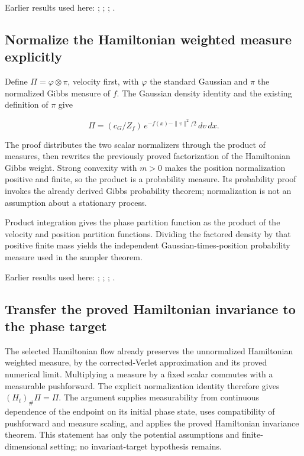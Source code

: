 \documentclass[11pt,a4paper]{report}
\begin{document}
Earlier results used here: \cite[Section~3.37.17]{LangevinLean2026ULASC}; \cite[Section~3.37.2]{LangevinLean2026ULASC}; \cite[Section~3.37.4]{LangevinLean2026ULASC}; \cite[Section~3.37.5]{LangevinLean2026ULASC}.
\subsection{\texorpdfstring{Normalize the Hamiltonian weighted measure explicitly}{Normalize the Hamiltonian weighted measure explicitly}}
\label{report-step-KineticLangevin-GibbsTarget-lean-2}


Define \(\Pi=\varphi\otimes\pi\), velocity first, with \(\varphi\) the standard Gaussian and \(\pi\) the normalized Gibbs measure of \(f\). The Gaussian density identity and the existing definition of \(\pi\) give

\[\Pi=(c_G/Z_f)\,e^{-f(x)-\|v\|^2/2}\,dv\,dx.\]

The proof distributes the two scalar normalizers through the product of measures, then rewrites the previously proved factorization of the Hamiltonian Gibbs weight. Strong convexity with \(m>0\) makes the position normalization positive and finite, so the product is a probability measure. Its probability proof invokes the already derived Gibbs probability theorem; normalization is not an assumption about a stationary process.



Product integration gives the phase partition function as the product of the velocity and position partition functions. Dividing the factored density by that positive finite mass yields the independent Gaussian-times-position probability measure used in the sampler theorem.



Earlier results used here: \cite[Section~3.26.13]{LangevinLean2026ULASC}; \cite[Section~3.26.2]{LangevinLean2026ULASC}; \cite[Section~3.26.3]{LangevinLean2026ULASC}; \cite[Section~3.37.2]{LangevinLean2026ULASC}.
\subsection{\texorpdfstring{Transfer the proved Hamiltonian invariance to the phase target}{Transfer the proved Hamiltonian invariance to the phase target}}
\label{report-step-KineticLangevin-GibbsTarget-lean-3}


The selected Hamiltonian flow already preserves the unnormalized Hamiltonian weighted measure, by the corrected-Verlet approximation and its proved numerical limit. Multiplying a measure by a fixed scalar commutes with a measurable pushforward. The explicit normalization identity therefore gives \((H_t)_\#\Pi=\Pi\). The argument supplies measurability from continuous dependence of the endpoint on its initial phase state, uses compatibility of pushforward and measure scaling, and applies the proved Hamiltonian invariance theorem. This statement has only the potential assumptions and finite-dimensional setting; no invariant-target hypothesis remains.
\end{document}
